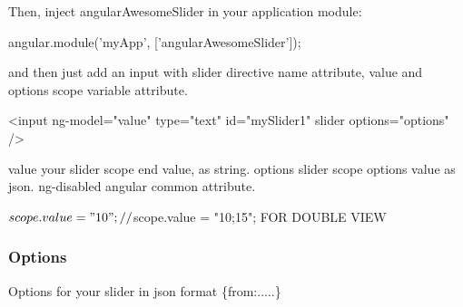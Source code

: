 Then, inject {\ttfamily angular\+Awesome\+Slider} in your application module\+:


\begin{DoxyCode}
angular.module('myApp', ['angularAwesomeSlider']);
\end{DoxyCode}


and then just add an {\ttfamily input} with {\ttfamily slider} directive name attribute, {\ttfamily value} and {\ttfamily options} scope variable attribute.


\begin{DoxyCode}
<input ng-model="value" type="text" id="mySlider1" slider options="options" />
\end{DoxyCode}


\textquotesingle{}value\textquotesingle{} your slider scope end value, as string. \textquotesingle{}options\textquotesingle{} slider scope options value as json. \textquotesingle{}ng-\/disabled\textquotesingle{} angular common attribute.


\begin{DoxyCode}
$scope.value = "10";
// $scope.value = "10;15"; FOR DOUBLE VIEW
\end{DoxyCode}


\subsubsection*{Options}

Options for your slider in json format \{from\+:.....\}


